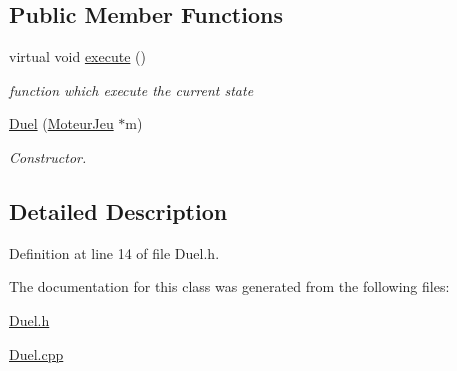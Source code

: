 \subsection*{Public Member Functions}
\begin{DoxyCompactItemize}
\item 
\hypertarget{class_duel_af5e8469a4f083d6fe9af8bfdbc8e1a46}{
virtual void \hyperlink{class_duel_af5e8469a4f083d6fe9af8bfdbc8e1a46}{execute} ()}
\label{class_duel_af5e8469a4f083d6fe9af8bfdbc8e1a46}

\begin{DoxyCompactList}\small\item\em function which execute the current state \item\end{DoxyCompactList}\item 
\hypertarget{class_duel_a2121478f84e9346ee5cfb40d45ad663f}{
\hyperlink{class_duel_a2121478f84e9346ee5cfb40d45ad663f}{Duel} (\hyperlink{class_moteur_jeu}{MoteurJeu} $\ast$m)}
\label{class_duel_a2121478f84e9346ee5cfb40d45ad663f}

\begin{DoxyCompactList}\small\item\em Constructor. \item\end{DoxyCompactList}\end{DoxyCompactItemize}


\subsection{Detailed Description}


Definition at line 14 of file Duel.h.



The documentation for this class was generated from the following files:\begin{DoxyCompactItemize}
\item 
\hyperlink{_duel_8h}{Duel.h}\item 
\hyperlink{_duel_8cpp}{Duel.cpp}\end{DoxyCompactItemize}
